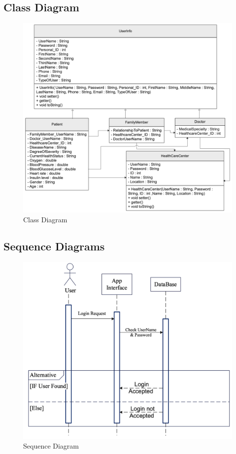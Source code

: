\documentclass[12pt]{article}
\begin{document}
		
			\subsection{Class Diagram}
			\begin{figure}[!h]
				\centering
				\includegraphics[width=\textwidth]{ClassDiagram.png}
				\caption{Class Diagram}
				\label{Class Diagram}
			\end{figure}
		
		\newpage
		
			\subsection{Sequence Diagrams}
			\begin{figure}[!h]
				\centering
				\includegraphics[width=\textwidth]{sequanceDiagram.png}
				\caption{Sequence Diagram}
				\label{Sequence Diagram}
			\end{figure}
		
\end{document}
